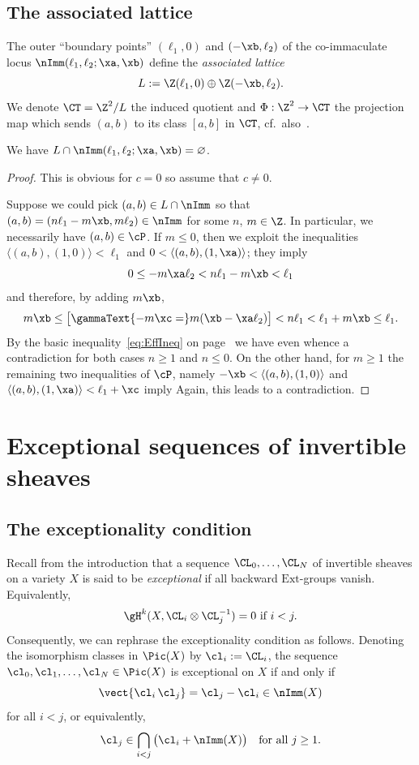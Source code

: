 \subsection{The associated lattice}
\label{subsec:AssLat}
The outer ``boundary points'' $(\ell_1,0)$ and 
$(-\xb,\ell_2)$ of the {co-immaculate} locus
$\nImm(\ell_1,\ell_2;\xa,\xb)$ 
define the {\em associated lattice}
$$
L:=\Z(\ell_1,0)\oplus\Z(-\xb,\ell_2).
$$
We denote $\CT=\Z^2/L$ the induced quotient 
and $\Phi:\Z^2\to\CT$ the projection map 
which sends $(a,b)$ to its class $[a,b]$ in $\CT$,
cf.\ also~\cite[Section 4]{p1p1p1}.

\begin{lemma}
\label{lem:LImm}
We have $L\cap\nImm(\ell_1,\ell_2;\xa,\xb)=\varnothing$. 
\end{lemma}

\begin{proof}
This is obvious for $c=0$ so assume that $c\not=0$.

Suppose we could pick $(a,b)\in L\cap\nImm$ so that 
$(a,b)=(n\ell_1-m\xb,m\ell_2)\in\nImm$ for some $n$, 
$m\in\Z$. In particular, we necessarily have 
$(a,b)\in\cP$. If $m\leq0$, 
{then we exploit the inequalities
$\langle (a,b),(1,0)\rangle <\ell_1$ and
$0<\langle (a,b),(1,\xa)\rangle$; they imply
}
$$
0\leq -m\xa\ell_2<n\ell_1-m\xb<\ell_1
$$ 
and therefore, {by adding $m\xb$,} 
$$
{m\xb\leq
\big[}\gammaText{-m\xc=}
m(\xb-\xa\ell_2)\big]<n\ell_1<\ell_1 +m\xb \leq \ell_1.
$$
By the basic inequality~\eqref{eq:EffIneq} 
on page~\pageref{eq:EffIneq} we have {even}
whence a contradiction for both cases $n\geq 1$ 
and $n\leq 0$. 
{On the other hand, for $m\geq1$ the 
remaining two inequalities of $\cP$, namely
$-\xb<\langle (a,b),(1,0)\rangle$ and
$\langle (a,b),(1,\xa)\rangle<\ell_1+\xc$ imply
}
{Again, this leads to a contradiction.}
\end{proof}

\section{Exceptional sequences of invertible sheaves}
\label{sec:ExcSeq}
\subsection{The exceptionality condition}
\label{subsubsec:ExcCon}
Recall from the introduction that a 
sequence $\CL_0,\ldots,\CL_N$ of 
invertible sheaves on a variety $X$ 
is said to be {\em exceptional} if 
all backward $\mathrm{Ext}$-groups 
vanish. Equivalently, 
$$
\gH^k(X,\CL_i\otimes\CL_j^{-1})=0\mbox{ if }i<j.
$$
Consequently, we can 
rephrase the exceptionality condition 
as follows. Denoting the isomorphism 
classes in $\Pic(X)$ by $\cl_i:=\CL_i$, 
the sequence
$\cl_0,\cl_1,\ldots,\cl_N\in\Pic(X)$ is 
exceptional on $X$ if and only if 
$$
\vect{\cl_i\,\cl_j}=\cl_j-\cl_i\in\nImm(X)
$$
for all $i<j$, or equivalently,
$$
\cl_j\in\bigcap_{i<j} \big(\cl_i+\nImm(X)\big)
\quad\mbox{for all }j\geq 1.
$$

